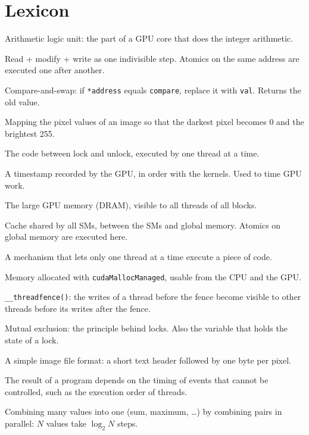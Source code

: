 \documentclass[main.tex]{subfiles}
\begin{document}
\section{Lexicon}
\label{sec:lexicon}

\begin{description}[nosep]
  \item[ALU] Arithmetic logic unit: the part of a GPU core that does the integer arithmetic.
  \item[Atomic operation] Read + modify + write as one indivisible step. Atomics on the same address are executed one after another.
  \item[\texttt{atomicCAS}] Compare-and-swap: if \texttt{*address} equals \texttt{compare}, replace it with \texttt{val}. Returns the old value.
  \item[Contrast stretching] Mapping the pixel values of an image so that the darkest pixel becomes 0 and the brightest 255.
  \item[Critical section] The code between lock and unlock, executed by one thread at a time.
  \item[CUDA event] A timestamp recorded by the GPU, in order with the kernels. Used to time GPU work.
  \item[Global memory] The large GPU memory (DRAM), visible to all threads of all blocks.
  \item[L2 cache] Cache shared by all SMs, between the SMs and global memory. Atomics on global memory are executed here.
  \item[Lock] A mechanism that lets only one thread at a time execute a piece of code.
  \item[Managed memory] Memory allocated with \texttt{cudaMallocManaged}, usable from the CPU and the GPU.
  \item[Memory fence] \texttt{\_\_threadfence()}: the writes of a thread before the fence become visible to other threads before its writes after the fence.
  \item[Mutex] Mutual exclusion: the principle behind locks. Also the variable that holds the state of a lock.
  \item[PGM] A simple image file format: a short text header followed by one byte per pixel.
  \item[Race condition] The result of a program depends on the timing of events that cannot be controlled, such as the execution order of threads.
  \item[Reduction] Combining many values into one (sum, maximum, \ldots) by combining pairs in parallel: $N$ values take $\log_2 N$ steps.

\end{description}
\end{document}
